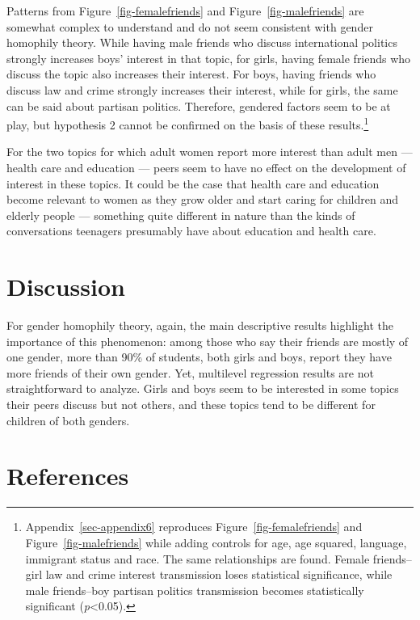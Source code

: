 \documentclass[
  letterpaper,
  DIV=11,
  numbers=noendperiod]{scrreprt}
\begin{document}
Patterns from Figure~\ref{fig-femalefriends} and
Figure~\ref{fig-malefriends} are somewhat complex to understand and do
not seem consistent with gender homophily theory. While having male
friends who discuss international politics strongly increases boys'
interest in that topic, for girls, having female friends who discuss the
topic also increases their interest. For boys, having friends who
discuss law and crime strongly increases their interest, while for
girls, the same can be said about partisan politics. Therefore, gendered
factors seem to be at play, but hypothesis 2 cannot be confirmed on the
basis of these results.\footnote{Appendix~\ref{sec-appendix6} reproduces
  Figure~\ref{fig-femalefriends} and Figure~\ref{fig-malefriends} while
  adding controls for age, age squared, language, immigrant status and
  race. The same relationships are found. Female friends--girl law and
  crime interest transmission loses statistical significance, while male
  friends--boy partisan politics transmission becomes statistically
  significant (\emph{p}\textless0.05).}

For the two topics for which adult women report more interest than adult
men --- health care and education --- peers seem to have no effect on
the development of interest in these topics. It could be the case that
health care and education become relevant to women as they grow older
and start caring for children and elderly people --- something quite
different in nature than the kinds of conversations teenagers presumably
have about education and health care.

\hypertarget{discussion-2}{%
\section{Discussion}\label{discussion-2}}

For gender homophily theory, again, the main descriptive results
highlight the importance of this phenomenon: among those who say their
friends are mostly of one gender, more than 90\% of students, both girls
and boys, report they have more friends of their own gender. Yet,
multilevel regression results are not straightforward to analyze. Girls
and boys seem to be interested in some topics their peers discuss but
not others, and these topics tend to be different for children of both
genders.

\hypertarget{references-4}{%
\section{References}\label{references-4}}
\end{document}
